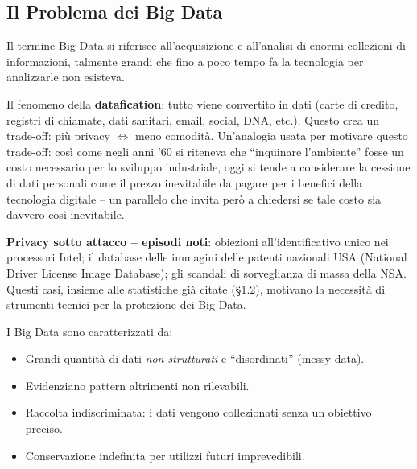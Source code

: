 \documentclass[a4paper,11pt]{article}
\begin{document}
\subsection{Il Problema dei Big Data}

\begin{definizione}
Il termine Big Data si riferisce all'acquisizione e all'analisi di enormi collezioni di informazioni, talmente grandi che fino a poco tempo fa la tecnologia per analizzarle non esisteva.
\end{definizione}

Il fenomeno della \textbf{datafication}: tutto viene convertito in dati (carte di credito, registri di chiamate, dati sanitari, email, social, DNA, etc.). Questo crea un trade-off: pi\`{u} privacy $\Leftrightarrow$ meno comodit\`{a}. Un'analogia usata per motivare questo trade-off: cos\`{i} come negli anni '60 si riteneva che ``inquinare l'ambiente'' fosse un costo necessario per lo sviluppo industriale, oggi si tende a considerare la cessione di dati personali come il prezzo inevitabile da pagare per i benefici della tecnologia digitale -- un parallelo che invita per\`{o} a chiedersi se tale costo sia davvero cos\`{i} inevitabile.

\textbf{Privacy sotto attacco -- episodi noti}: obiezioni all'identificativo unico nei processori Intel; il database delle immagini delle patenti nazionali USA (National Driver License Image Database); gli scandali di sorveglianza di massa della NSA. Questi casi, insieme alle statistiche gi\`{a} citate (\S1.2), motivano la necessit\`{a} di strumenti tecnici per la protezione dei Big Data.

\begin{definizione}
I Big Data sono caratterizzati da:
\begin{itemize}
  \item Grandi quantit\`{a} di dati \emph{non strutturati} e ``disordinati'' (messy data).
  \item Evidenziano pattern altrimenti non rilevabili.
  \item Raccolta indiscriminata: i dati vengono collezionati senza un obiettivo preciso.
  \item Conservazione indefinita per utilizzi futuri imprevedibili.
\end{itemize}
\end{definizione}
\end{document}
